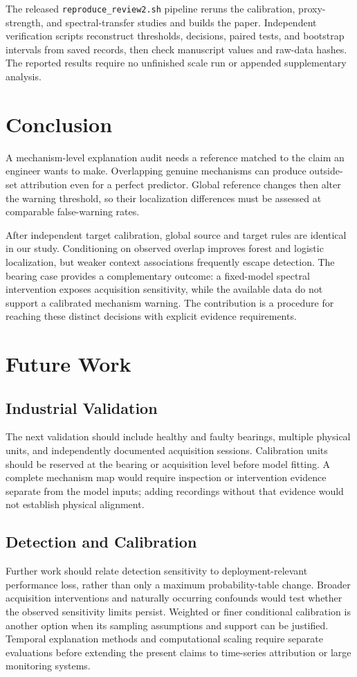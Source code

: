 \documentclass[conference]{IEEEtran}
\begin{document}
The released \texttt{reproduce\_review2.sh} pipeline reruns the calibration, proxy-strength, and spectral-transfer studies and builds the paper. Independent verification scripts reconstruct thresholds, decisions, paired tests, and bootstrap intervals from saved records, then check manuscript values and raw-data hashes. The reported results require no unfinished scale run or appended supplementary analysis.

\section{Conclusion}
A mechanism-level explanation audit needs a reference matched to the claim an engineer wants to make. Overlapping genuine mechanisms can produce outside-set attribution even for a perfect predictor. Global reference changes then alter the warning threshold, so their localization differences must be assessed at comparable false-warning rates.

After independent target calibration, global source and target rules are identical in our study. Conditioning on observed overlap improves forest and logistic localization, but weaker context associations frequently escape detection. The bearing case provides a complementary outcome: a fixed-model spectral intervention exposes acquisition sensitivity, while the available data do not support a calibrated mechanism warning. The contribution is a procedure for reaching these distinct decisions with explicit evidence requirements.

\section{Future Work}
\subsection{Industrial Validation}
The next validation should include healthy and faulty bearings, multiple physical units, and independently documented acquisition sessions. Calibration units should be reserved at the bearing or acquisition level before model fitting. A complete mechanism map would require inspection or intervention evidence separate from the model inputs; adding recordings without that evidence would not establish physical alignment.

\subsection{Detection and Calibration}
Further work should relate detection sensitivity to deployment-relevant performance loss, rather than only a maximum probability-table change. Broader acquisition interventions and naturally occurring confounds would test whether the observed sensitivity limits persist. Weighted or finer conditional calibration is another option when its sampling assumptions and support can be justified. Temporal explanation methods and computational scaling require separate evaluations before extending the present claims to time-series attribution or large monitoring systems.
\end{document}
